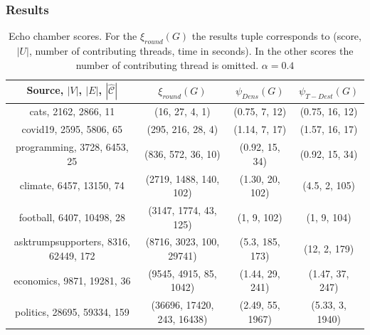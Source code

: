 \documentclass{beamer}
\begin{document}
\begin{frame}[c]
	\frametitle{Results}

	\tiny{
		\begin{table}[htpb]
			\centering
			\caption{Echo chamber scores. For the $\xi_{round}(G) $ the results tuple
				corresponds to (score, $|U|$, number of contributing threads, time in
				seconds). In the other scores the number of contributing thread
				is omitted. $\alpha = 0.4$}
			\begin{tabular}{c|c|c|c}
				\textbf{Source, $|V|$, $|E|$, $|\hat{\mathcal{C}}  |$} & $\xi_{round}(G) $          & $\psi_{Dens}(G)$ & $\psi_{T-Dest} (G)$ \\
				\hline
				cats, 2162, 2866, 11                                   & (16, 27, 4, 1)             & (0.75, 7, 12)    & (0.75, 16, 12)      \\
				covid19, 2595, 5806, 65                                & (295, 216, 28, 4)          & (1.14, 7, 17)    & (1.57, 16, 17)      \\
				programming, 3728, 6453, 25                            & (836, 572, 36, 10)         & (0.92, 15, 34)   & (0.92, 15, 34)      \\
				climate, 6457, 13150, 74                               & (2719, 1488, 140, 102)     & (1.30, 20, 102)  & (4.5, 2, 105)       \\
				football, 6407, 10498, 28                              & (3147, 1774, 43, 125)      & (1, 9, 102)      & (1, 9, 104)         \\
				asktrumpsupporters, 8316, 62449, 172                   & (8716, 3023, 100, 29741)   & (5.3, 185, 173)  & (12, 2, 179)        \\
				economics, 9871, 19281, 36                             & (9545, 4915, 85, 1042)     & (1.44, 29, 241)  & (1.47, 37, 247)     \\
				politics, 28695,  59334, 159                           & (36696, 17420, 243, 16438) & (2.49, 55, 1967) & (5.33, 3, 1940)     \\
			\end{tabular}
		\end{table}
	}

\end{frame}
\end{document}
